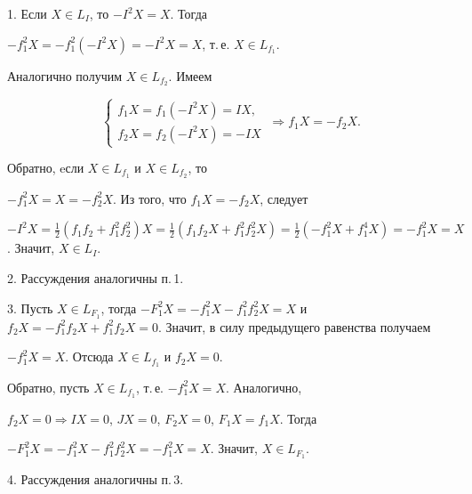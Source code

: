 \begin{pf}


1. Если $X\in L_I$, то $-I^2X=X$. Тогда 


$-f_1^2X=-f_1^2(-I^2X)=-I^2X=X$, т.\,е. $X\in L_{f_1}$.


Аналогично получим $X\in L_{f_2}$. Имеем


$$


\begin{cases}


f_1X=f_1(-I^2X)=IX, \\


f_2X=f_2(-I^2X)=-IX


\end{cases}


\ \Rightarrow f_1X=-f_2X.


$$





Обратно, eсли $X\in L_{f_1}$ и $X\in L_{f_2}$, то


$-f_1^2X=X=-f_2^2X$. Из того, что $f_1X=-f_2X$, следует


$-I^2X=\frac{1}{2}(f_1f_2+f_1^2f_2^2)X =


\frac{1}{2}(f_1f_2X+f_1^2f_2^2X) = \frac{1}{2}(-f_1^2X+f_1^4X) =


-f_1^2X=X$. Значит, $X\in L_I$.





2. Рассуждения аналогичны п.\,1.





3. Пусть $X\in L_{F_1}$, тогда $-F_1^2X =


-f_1^2X - f_1^2f_2^2X = X$ и $f_2X = -f_1^2f_2X + f_1^2f_2X =


0$. Значит, в силу предыдущего равенства получаем


$-f_1^2X=X$. Отсюда $X\in L_{f_1}$ и $f_2X=0$.





Обратно, пусть $X\in L_{f_1}$, т.\,е. $-f_1^2X=X$. Аналогично,


$f_2X=0\Rightarrow IX=0$, $JX=0$, $F_2X=0$, $F_1X=f_1X$. Тогда


$-F_1^2X=-f_1^2X-f_1^2f_2^2X=-f_1^2X=X$. Значит, $X\in L_{F_1}$.





4. Рассуждения аналогичны п.\,3.


\end{pf}





